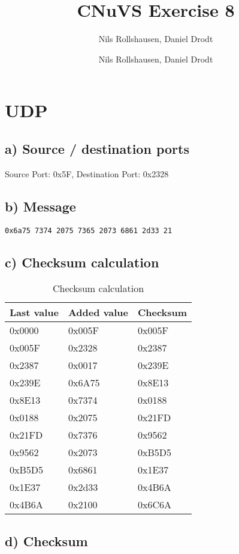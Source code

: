 \documentclass[a4paper, 11 pt, article, accentcolor=tud7b]{tudreport}
\title{CNuVS Exercise 8}
\author{Nils Rollshausen, Daniel Drodt}
\subtitle{Nils Rollshausen, Daniel Drodt}
\begin{document}
	\maketitle
	\section{UDP}
	\subsection*{a) Source / destination ports}
	Source Port: 0x5F, Destination Port: 0x2328
	  
	\subsection*{b) Message}
	\verb|0x6a75 7374 2075 7365 2073 6861 2d33 21|
	
	\subsection*{c) Checksum calculation}
	
	\begin{table}[h]
	  \centering
	  \begin{tabular}{| l | l | l |}
	    \hline
	    Last value & Added value & Checksum \\ \hline
	    0x0000 & 0x005F & 0x005F \\ \hline
	    0x005F & 0x2328 & 0x2387 \\ \hline
	    0x2387 & 0x0017 & 0x239E \\ \hline
	    0x239E & 0x6A75 & 0x8E13 \\ \hline
	    0x8E13 & 0x7374 & 0x0188 \\ \hline
	    0x0188 & 0x2075 & 0x21FD \\ \hline
	    0x21FD & 0x7376 & 0x9562 \\ \hline
	    0x9562 & 0x2073 & 0xB5D5 \\ \hline
	    0xB5D5 & 0x6861 & 0x1E37 \\ \hline
	    0x1E37 & 0x2d33 & 0x4B6A \\ \hline
	    0x4B6A & 0x2100 & 0x6C6A \\ \hline
	  \end{tabular}
	  \caption{Checksum calculation}
	\end{table}
	\subsection*{d) Checksum}
	
\end{document}
